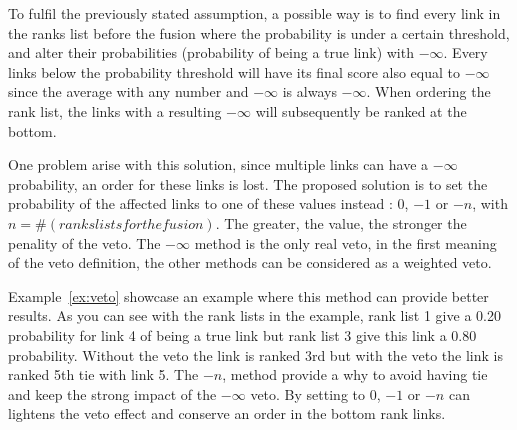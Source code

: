 To fulfil the previously stated assumption, a possible way is to find every link in the ranks list before the fusion where the probability is under a certain threshold, and alter their probabilities (probability of being a true link) with $-\infty$.
Every links below the probability threshold will have its final score also equal to $-\infty$ since the average with any number and $-\infty$ is always $-\infty$.
When ordering the rank list, the links with a resulting $-\infty$ will subsequently be ranked at the bottom.

One problem arise with this solution, since multiple links can have a $-\infty$ probability, an order for these links is lost.
The proposed solution is to set the probability of the affected links to one of these values instead : $0$, $-1$ or $-n$, with $n = \#(ranks lists for the fusion)$.
The greater, the value, the stronger the penality of the veto.
The $-\infty$ method is the only real veto, in the first meaning of the veto definition, the other methods can be considered as a weighted veto.

Example~\ref{ex:veto} showcase an example where this method can provide better results.
As you can see with the rank lists in the example, rank list 1 give a 0.20 probability for link 4 of being a true link but rank list 3 give this link a 0.80 probability.
Without the veto the link is ranked 3rd but with the veto the link is ranked 5th tie with link 5.
The $-n$, method provide a why to avoid having tie and keep the strong impact of the $-\infty$ veto.
By setting to $0$, $-1$ or $-n$ can lightens the veto effect and conserve an order in the bottom rank links.

